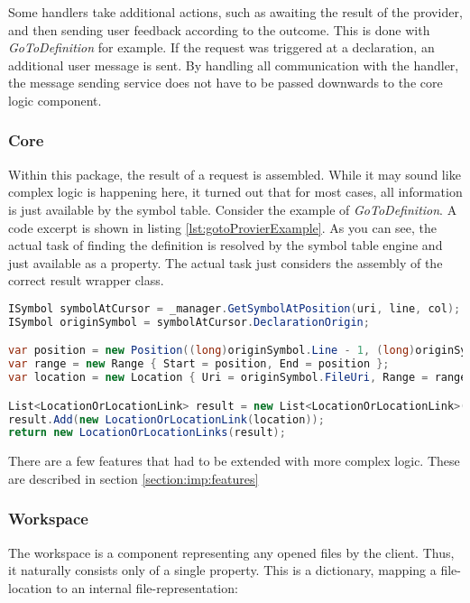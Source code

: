 Some handlers take additional actions, such as awaiting the result of the provider, and then sending user feedback according to the outcome.
This is done with \textit{GoToDefinition} for example.
If the request was triggered at a declaration, an additional user message is sent.
By handling all communication with the handler, the message sending service does not have to be passed downwards to the core logic component.


\subsubsection{Core}
Within this package, the result of a request is assembled.
While it may sound like complex logic is happening here, it turned out that for most cases, all information is just available by the symbol table.
Consider the example of \textit{GoToDefinition}.
A code excerpt is shown in listing \ref{lst:gotoProvierExample}.
As you can see, the actual task of finding the definition is resolved by the symbol table engine and just available as a property.
The actual task just considers the assembly of the correct result wrapper class.

\begin{lstlisting}[language=csharp, caption={\textit{GoToDefinition}, Core Provider}, captionpos=b, label={lst:gotoProvierExample}]
ISymbol symbolAtCursor = _manager.GetSymbolAtPosition(uri, line, col);
ISymbol originSymbol = symbolAtCursor.DeclarationOrigin;

var position = new Position((long)originSymbol.Line - 1, (long)originSymbol.Column - 1);
var range = new Range { Start = position, End = position };
var location = new Location { Uri = originSymbol.FileUri, Range = range };

List<LocationOrLocationLink> result = new List<LocationOrLocationLink>();
result.Add(new LocationOrLocationLink(location));
return new LocationOrLocationLinks(result);
\end{lstlisting}

There are a few features that had to be extended with more complex logic.
These are described in section \ref{section:imp:features}

\subsubsection{Workspace}
The workspace is a component representing any opened files by the client.
Thus, it naturally consists only of a single property.
This is a dictionary, mapping a file-location to an internal file-representation:

